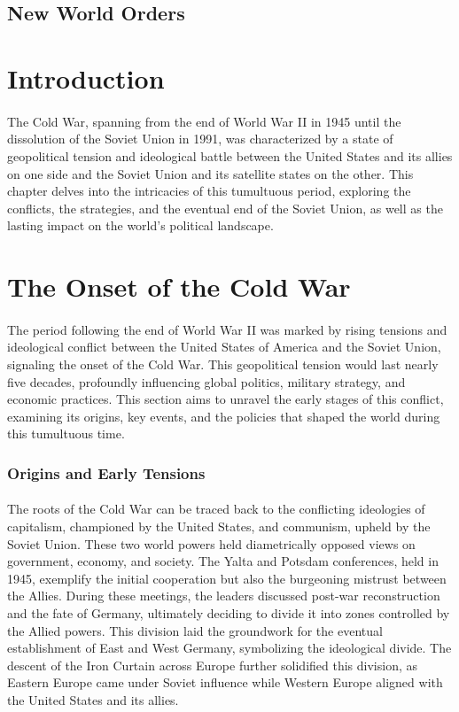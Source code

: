 \documentclass[a4paper,12pt]{book}
\begin{document}
\subsection*{New World Orders}

\section*{Introduction}
\paragraph{}
The Cold War, spanning from the end of World War II in 1945 until the dissolution of the Soviet Union in 1991, was characterized by a state of geopolitical tension and ideological battle between the United States and its allies on one side and the Soviet Union and its satellite states on the other. This chapter delves into the intricacies of this tumultuous period, exploring the conflicts, the strategies, and the eventual end of the Soviet Union, as well as the lasting impact on the world’s political landscape.

\section*{The Onset of the Cold War}
\paragraph{}
The period following the end of World War II was marked by rising tensions and ideological conflict between the United States of America and the Soviet Union, signaling the onset of the Cold War. This geopolitical tension would last nearly five decades, profoundly influencing global politics, military strategy, and economic practices. This section aims to unravel the early stages of this conflict, examining its origins, key events, and the policies that shaped the world during this tumultuous time.

\subsubsection*{Origins and Early Tensions}
\paragraph{}
The roots of the Cold War can be traced back to the conflicting ideologies of capitalism, championed by the United States, and communism, upheld by the Soviet Union. These two world powers held diametrically opposed views on government, economy, and society. The Yalta and Potsdam conferences, held in 1945, exemplify the initial cooperation but also the burgeoning mistrust between the Allies. During these meetings, the leaders discussed post-war reconstruction and the fate of Germany, ultimately deciding to divide it into zones controlled by the Allied powers. This division laid the groundwork for the eventual establishment of East and West Germany, symbolizing the ideological divide. The descent of the Iron Curtain across Europe further solidified this division, as Eastern Europe came under Soviet influence while Western Europe aligned with the United States and its allies. 
\end{document}
